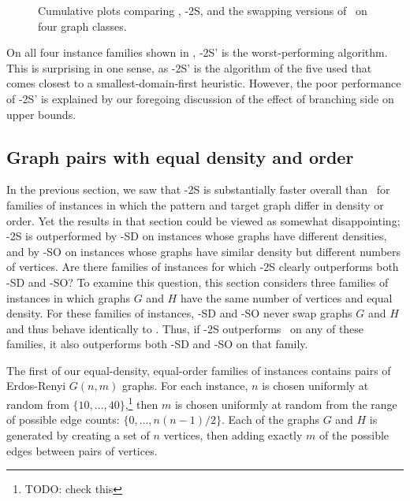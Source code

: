 \begin{figure}[htb]
{        \label{figure:mcsplit2-cumulative-mixandmatch}
    }
    \caption{Cumulative plots comparing \McSplit, \McSplit-2S, and the swapping versions of \McSplit\ on four graph classes.}
    \label{figure:mcsplit2-cumulative}
\end{figure}

On all four instance families shown in , \McSplit-2S'
is the worst-performing algorithm.  This is surprising in one sense, as \McSplit-2S' is the algorithm
of the five used that comes closest to a smallest-domain-first heuristic.  However, the poor performance
of \McSplit-2S' is explained by our foregoing discussion of the effect of branching side on upper
bounds.

\subsection{Graph pairs with equal density and order}

In the previous section, we saw that \McSplit-2S is substantially faster overall than \McSplit\ for families
of instances in which the pattern and target graph differ in density or order.  Yet the results in that
section could be viewed as somewhat disappointing; \McSplit-2S is outperformed by \McSplit-SD on instances
whose graphs have different densities, and by \McSplit-SO on instances whose graphs have similar density
but different numbers of vertices.  Are there families of instances for which \McSplit-2S clearly outperforms
both \McSplit-SD and \McSplit-SO?  To examine this question, this section considers three families of instances
in which graphs $G$ and $H$ have the same number of vertices and equal density.  For these families
of instances, \McSplit-SD and \McSplit-SO never swap graphs $G$ and $H$ and thus behave identically to
\McSplit.  Thus, if \McSplit-2S outperforms \McSplit\ on any of these families, it also
outperforms both \McSplit-SD and \McSplit-SO on that family.

The first of our equal-density, equal-order families of instances contains pairs of Erdos-Renyi $G(n,m)$ graphs.  For each instance,
$n$ is chosen uniformly at random from $\{10, \dots, 40\}$,\footnote{TODO: check this} then $m$ is chosen
uniformly at random from the range of possible edge counts: $\{0, \dots, n(n-1)/2\}$.  Each of the graphs
$G$ and $H$ is generated by creating a set of $n$ vertices, then adding exactly $m$ of the possible edges
between pairs of vertices.

